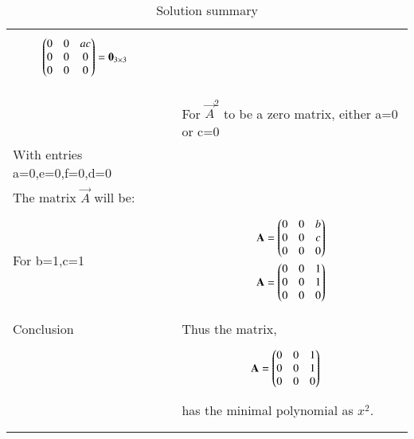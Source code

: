 \begin{longtable}{|l|l|}
{\begin{align*}
    \begin{pmatrix}0&0&ac\\0&0&0\\0&0&0\end{pmatrix}&=\mathbf{0}_{3\times3}
\end{align*}}\\
&\\
\hline
\pagebreak
\hline
&\\
&For $\vec{A}^2$ to be a zero matrix, either a=0 or c=0\\
With entries a=0,e=0,f=0,d=0&\\
The matrix $\vec{A}$ will be:&\\
For b=1,c=1&\parbox{6cm}{\begin{align*}
    \mathbf{A}&=\begin{pmatrix}0&0&b\\0&0&c\\0&0&0\end{pmatrix}\\
    \mathbf{A}&=\begin{pmatrix}0&0&1\\0&0&1\\0&0&0\end{pmatrix}
\end{align*}}\\
\hline
&\\
Conclusion&Thus the matrix,\\
&\parbox{6cm}{\begin{align*}
        \mathbf{A}&=\begin{pmatrix}0&0&1\\0&0&1\\0&0&0\end{pmatrix}
\end{align*}}\\
&has the minimal polynomial as $x^2$.\\
&\\
\hline
\caption{Solution summary}
\label{eq:solutions/6/3/6/table:2}
\end{longtable}
\twocolumn
